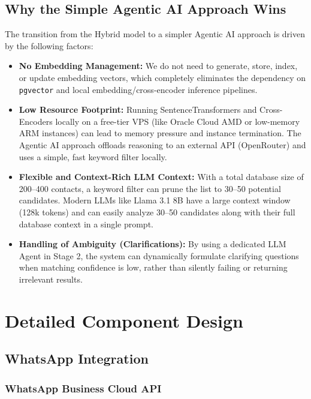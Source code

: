 \documentclass[12pt, a4paper]{report}
\newcommand{\techstack}[1]{\texttt{#1}}
\begin{document}
\section{Why the Simple Agentic AI Approach Wins}

The transition from the Hybrid model to a simpler Agentic AI approach is driven by the following factors:

\begin{itemize}
    \item \textbf{No Embedding Management:} We do not need to generate, store, index, or update embedding vectors, which completely eliminates the dependency on \techstack{pgvector} and local embedding/cross-encoder inference pipelines.
    \item \textbf{Low Resource Footprint:} Running SentenceTransformers and Cross-Encoders locally on a free-tier VPS (like Oracle Cloud AMD or low-memory ARM instances) can lead to memory pressure and instance termination. The Agentic AI approach offloads reasoning to an external API (OpenRouter) and uses a simple, fast keyword filter locally.
    \item \textbf{Flexible and Context-Rich LLM Context:} With a total database size of 200--400 contacts, a keyword filter can prune the list to 30--50 potential candidates. Modern LLMs like Llama 3.1 8B have a large context window (128k tokens) and can easily analyze 30--50 candidates along with their full database context in a single prompt.
    \item \textbf{Handling of Ambiguity (Clarifications):} By using a dedicated LLM Agent in Stage 2, the system can dynamically formulate clarifying questions when matching confidence is low, rather than silently failing or returning irrelevant results.
\end{itemize}

\chapter{Detailed Component Design}
\label{ch:component_design}

\section{WhatsApp Integration}

\subsection{WhatsApp Business Cloud API}
\end{document}
